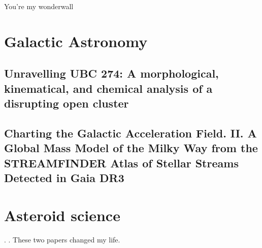 \hypertarget{Appendices}{You're my wonderwall}
\section{Galactic Astronomy}
\subsection*{Unravelling UBC 274: A morphological, kinematical, and chemical analysis of a disrupting open cluster}
\subsection*{Charting the Galactic Acceleration Field. II. A Global Mass Model of the Milky Way from the STREAMFINDER Atlas of Stellar Streams Detected in Gaia DR3}
\citet{2024ApJ...967...89I}

\section{Asteroid science}
\citet{2023A&A...676A...5F}. \citet{2024A&A...682A..64B}. These two papers changed my life. 

